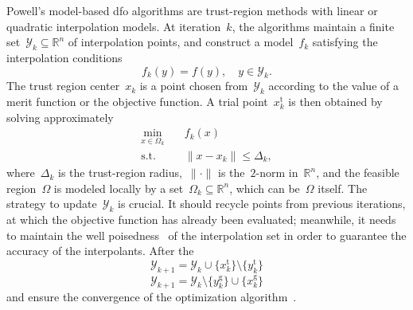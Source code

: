 \documentclass[11pt,draft]{article}
\numberwithin{equation}{section}
\def\R{\ensuremath{\mathbb{R}}}
\newcommand\norm[2][]{#1\|#2#1\|}
\def\obj{\ensuremath{f}}
\def\srchsp{\ensuremath{\Omega}}
\newcommand\objmdl[1][k]{\obj_{#1}}
\newcommand\srchspmdl[1][k]{\Omega_{#1}}
\newcommand\iter[1][k]{x_{#1}}
\newcommand\trg[1][k]{\Delta_{#1}}
\newcommand\itpls[1][k]{\mathcal{Y}_{#1}}
\newcommand\trial{{\text{t}}}
\newcommand\geo{{\text{g}}}
\begin{document}
Powell's model-based \gls{dfo} algorithms are trust-region methods with linear or quadratic interpolation models.
At iteration~$k$, the algorithms maintain a finite set~$\itpls \subseteq \R^n$ of interpolation points,
and construct a model~$\objmdl$ satisfying the interpolation conditions
\begin{equation}
    \label{eq:itpls}
    \objmdl(y) = \obj(y), \quad y \in \itpls.
\end{equation}
The trust region center~$\iter$ is a point chosen from~$\itpls$ according to the value of a merit
function or the objective function. A trial point~$\iter^{\trial}$ is then obtained by solving approximately
\begin{subequations}
    \label{eq:trsp}
    \begin{align}
        \min_{x \in \srchspmdl} & \quad \objmdl(x)\\
        \text{s.t.}             & \quad \norm{x - \iter} \le \trg, \label{eq:trsp-tr}
    \end{align}
\end{subequations}
where~$\trg$ is the trust-region radius,~$\norm{\cdot}$ is the~$2$-norm in~$\R^n$,
and the feasible region~$\srchsp$ is modeled locally by a set~$\srchspmdl \subseteq \R^n$,
which can be~$\srchsp$ itself.
The strategy to update~$\itpls$ is crucial.
It should recycle points from previous iterations, at which the objective function has already been
evaluated; meanwhile, it needs to maintain the well
poisedness~\cite{Sauer_Xu_1995,Conn_Scheinberg_Vicente_2009b} of
the interpolation set in order to guarantee the accuracy of the interpolants.
After the
\[
    \itpls[k+1] = \itpls \cup \{\iter^{\trial}\} \setminus\{y_k^{\trial}\}
\]
\[
    \itpls[k+1] = \itpls \setminus\{y_k^{\geo}\} \cup \{\iter^{\geo}\}
\]
and ensure the convergence of the optimization algorithm~\cite{Conn_Scheinberg_Vicente_2008a,Conn_Scheinberg_Vicente_2008b, Fasano_Morales_Nocedal_2009,Scheinberg_Toint_2010}.


\subsection{}
\end{document}
